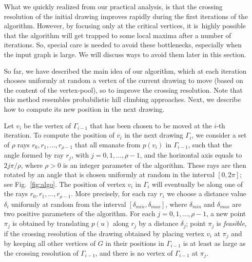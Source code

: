 \documentclass[runningheads]{llncs}
\begin{document}
What we quickly realized from our practical analysis, is that the crossing resolution of the initial drawing improves rapidly during the first iterations of the algorithm. However, by focusing only at the critical vertices, it is~highly possible that the algorithm will get trapped to some local maxima after a number of iterations. So, special care is needed to avoid these bottlenecks, especially when the input graph is large. We will discuss ways to avoid them later in this section.

So far, we have described the main idea of our algorithm, which at each iteration chooses uniformly at random a vertex of the current drawing to move (based on the content of the vertex-pool), so to improve the crossing resolution. Note that this method resembles probabilistic hill climbing approaches. Next, we  describe how to compute its new position in the next drawing.

Let $v_i$ be the vertex of $\Gamma_{i-1}$ that has been chosen to be moved at the $i$-th iteration.
To compute the position of $v_i$ in the next drawing $\Gamma_i$, we consider a set of $\rho$ rays $r_0,r_1,\ldots,r_{\rho-1}$ that all emanate from $p(v_i)$ in $\Gamma_{i-1}$, such that the angle formed by ray $r_j$, with $j=0,1,\ldots,\rho-1$, and the horizontal axis equals to $2j\pi/\rho$, where $\rho>0$ is an integer parameter of the algorithm. These rays are then rotated by an angle that is chosen uniformly at random in the interval $[0,2\pi]$; see Fig.~\ref{fig:algo}. The position of vertex $v_i$ in $\Gamma_i$ will eventually be along one of the rays $r_0,r_1,\ldots,r_{\rho-1}$. More precisely, for each ray $r_i$ we choose a distance value $\delta_i$ uniformly at random from the interval $[\delta_{min},\delta_{max}]$, where $\delta_{min}$ and $\delta_{max}$ are two positive parameters of the algorithm. For each $j=0,1,\ldots,\rho-1$, a new point $\pi_j$ is obtained by translating $p(u)$ along $r_j$ by a distance $\delta_j$; point $\pi_j$ is \emph{feasible}, if the crossing resolution of the drawing obtained by placing vertex $v_i$ at $\pi_j$ and by keeping all other vertices of $G$ in their positions in $\Gamma_{i-1}$ is at least as large as the crossing resolution of $\Gamma_{i-1}$, and there is no vertex of $\Gamma_{i-1}$ at $\pi_j$.
\end{document}
